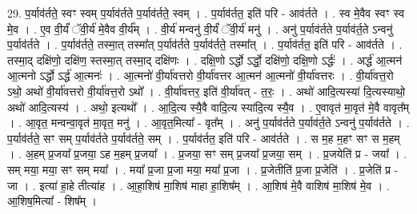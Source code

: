 \documentclass[17pt]{extarticle}
\begin{document}
29. प॒र्याव॑र्तते॒ स्वꣳ स्वम् प॒र्याव॑र्तते प॒र्याव॑र्तते॒ स्वम् । . प॒र्याव॑र्तत॒ इति॑ परि - आव॑र्तते । . स्व मे॒वैव स्वꣳ स्व मे॒व । . ए॒व वी॒र्यं॑ ॅवी॒र्य॑ मे॒वैव वी॒र्य᳚म् । . वी॒र्य॑ मन्वनु॑ वी॒र्यं॑ ॅवी॒र्य॑ मनु॑ । . अनु॑ प॒र्याव॑र्तते प॒र्याव॑र्त॒ते ऽन्वनु॑ प॒र्याव॑र्तते । . प॒र्याव॑र्तते॒ तस्मा॒त् तस्मा᳚त् प॒र्याव॑र्तते प॒र्याव॑र्तते॒ तस्मा᳚त् । . प॒र्याव॑र्तत॒ इति॑ परि - आव॑र्तते । . तस्मा॒द् दक्षि॑णो॒ दक्षि॑ण॒ स्तस्मा॒त् तस्मा॒द् दक्षि॑णः । . दक्षि॒णो ऽर्द्धो ऽर्द्धो॒ दक्षि॑णो॒ दक्षि॒णो ऽर्द्धः॑ । . अर्द्ध॑ आ॒त्मन॑ आ॒त्मनो ऽर्द्धो ऽर्द्ध॑ आ॒त्मनः॑ । . आ॒त्मनो॑ वी॒र्या॑वत्तरो वी॒र्या॑वत्तर आ॒त्मन॑ आ॒त्मनो॑ वी॒र्या॑वत्तरः । . वी॒र्या॑वत्त॒रो ऽथो॒ अथो॑ वी॒र्या॑वत्तरो वी॒र्या॑वत्त॒रो ऽथो᳚ । . वी॒र्या॑वत्तर॒ इति॑ वी॒र्या॑वत् - त॒रः॒ । . अथो॑ आदि॒त्यस्या॑ दि॒त्यस्याथो॒ अथो॑ आदि॒त्यस्य॑ । . अथो॒ इत्यथो᳚ । . आ॒दि॒त्य स्यै॒वै वादि॒त्य स्या॑दि॒त्य स्यै॒व । . ए॒वावृत॑ मा॒वृत॑ मे॒वै वावृत᳚म् । . आ॒वृत॒ मन्वन्वा॒वृत॑ मा॒वृत॒ मनु॑ । . आ॒वृत॒मित्या᳚ - वृत᳚म् । . अनु॑ प॒र्याव॑र्तते प॒र्याव॑र्त॒ते ऽन्वनु॑ प॒र्याव॑र्तते । . प॒र्याव॑र्तते॒ सꣳ सम् प॒र्याव॑र्तते प॒र्याव॑र्तते॒ सम् । . प॒र्याव॑र्तत॒ इति॑ परि - आव॑र्तते । . स म॒ह म॒हꣳ सꣳ स म॒हम् । . अ॒हम् प्र॒जया᳚ प्र॒जया॒ ऽह म॒हम् प्र॒जया᳚ । . प्र॒जया॒ सꣳ सम् प्र॒जया᳚ प्र॒जया॒ सम् । . प्र॒जयेति॑ प्र - जया᳚ । . सम् मया॒ मया॒ सꣳ सम् मया᳚ । . मया᳚ प्र॒जा प्र॒जा मया॒ मया᳚ प्र॒जा । . प्र॒जेतीति॑ प्र॒जा प्र॒जेति॑ । . प्र॒जेति॑ प्र - जा । . इत्या॑ हा॒हे तीत्या॑ह । . आ॒हा॒शिष॑ मा॒शिष॑ माहा हा॒शिष᳚म् । . आ॒शिष॑ मे॒वै वाशिष॑ मा॒शिष॑ मे॒व । . आ॒शिष॒मित्या᳚ - शिष᳚म् । \newline
\end{document}
